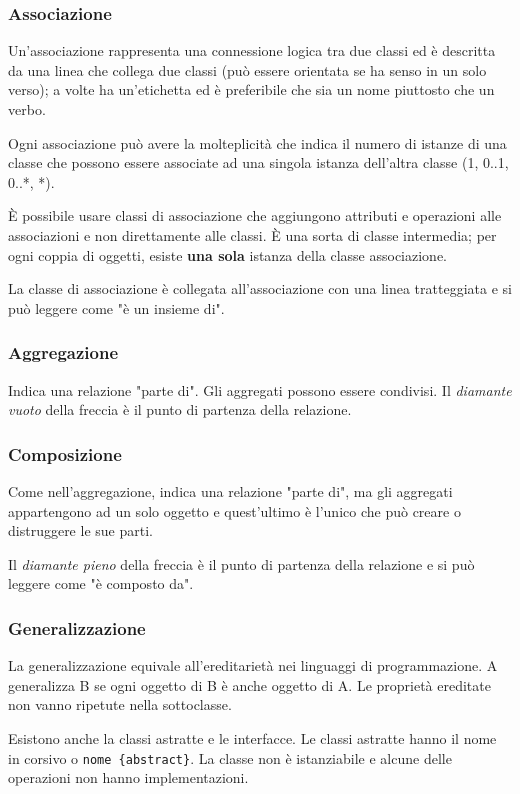 \subsubsection{Associazione}
Un'associazione rappresenta una connessione logica tra due classi ed è descritta da una linea che collega due classi 
(può essere orientata se ha senso in un solo verso); a volte ha un'etichetta ed è preferibile che sia un nome piuttosto che un verbo.

Ogni associazione può avere la molteplicità che indica il numero di istanze di una classe che possono essere associate ad una singola istanza dell'altra classe (1, 0..1, 0..*, *).

\`E possibile usare classi di associazione che aggiungono attributi e operazioni alle associazioni e non direttamente alle classi. 
\`E una sorta di classe intermedia; per ogni coppia di oggetti, esiste \textbf{una sola} istanza della classe associazione. 

La classe di associazione è collegata all'associazione con una linea tratteggiata e si può leggere come "è un insieme di".

\subsubsection{Aggregazione}
Indica una relazione "parte di". Gli aggregati possono essere condivisi. Il \textit{diamante vuoto} della freccia è il punto di partenza della relazione.

\subsubsection{Composizione}
Come nell'aggregazione, indica una relazione "parte di", ma gli aggregati appartengono ad un solo oggetto e quest'ultimo è l'unico che può creare o distruggere le sue parti. 

Il \textit{diamante pieno} della freccia è il punto di partenza della relazione e si può leggere come "è composto da".

\subsubsection{Generalizzazione}
La generalizzazione equivale all'ereditarietà nei linguaggi di programmazione. 
A generalizza B se ogni oggetto di B è anche oggetto di A. Le proprietà ereditate non vanno ripetute nella sottoclasse.

Esistono anche la classi astratte e le interfacce. Le classi astratte hanno il nome in corsivo o \texttt{nome \{abstract\}}. La classe non è istanziabile e alcune delle operazioni non hanno implementazioni. 

